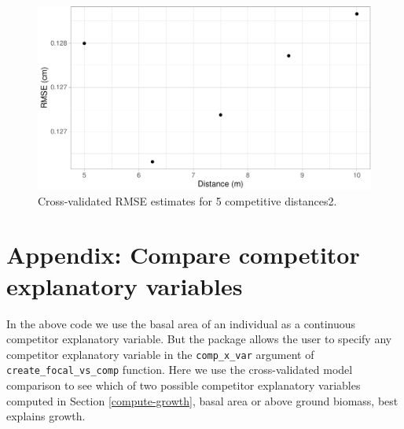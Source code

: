 \documentclass[12pt]{article}
\begin{document}
\begin{figure}

{\centering \includegraphics[width=1\linewidth]{Figures/appendix2-plot-1} 

}

\caption{Cross-validated RMSE estimates for 5 competitive distances2.}\label{fig:appendix2-plot}
\end{figure}

\hypertarget{compare-pred-var}{%
\section{Appendix: Compare competitor explanatory
variables}\label{compare-pred-var}}

In the above code we use the basal area of an individual as a continuous
competitor explanatory variable. But the package allows the user to
specify any competitor explanatory variable in the \texttt{comp\_x\_var}
argument of \texttt{create\_focal\_vs\_comp} function. Here we use the
cross-validated model comparison to see which of two possible competitor
explanatory variables computed in Section \ref{compute-growth}, basal
area or above ground biomass, best explains growth.
\end{document}
